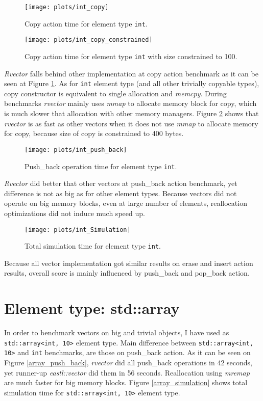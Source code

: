 \documentclass[inz, english, shortabstract]{iithesis}
\begin{document}
\begin{figure}[h!]
\label{int_copy}
\texttt{[image: plots/int\_copy]}
\caption{Copy action time for element type \lstinline{int}.}
\end{figure}

\begin{figure}[h!]
\label{int_copy_constrained}
\texttt{[image: plots/int\_copy\_constrained]}
\caption{Copy action time for element type \lstinline{int} with size constrained to 100.}
\end{figure}

{\it Rvector} falls behind other implementation at copy action benchmark as it can be seen at Figure \ref{int_copy}. As for \lstinline{int} element type (and all other trivially copyable types), copy constructor is equivalent to single allocation and {\it memcpy}. During benchmarks {\it rvector} mainly uses {\it mmap} to allocate memory block for copy, which is much slower that allocation with other memory managers. Figure \ref{int_copy_constrained} shows that {\it rvector} is as fast as other vectors when it does not use {\it mmap} to allocate memory for copy, because size of copy is constrained to 400 bytes.

\begin{figure}[h!]
\label{int_push_back}
\texttt{[image: plots/int\_push\_back]}
\caption{Push\_back operation time for element type \lstinline{int}.}
\end{figure}

{\it Rvector} did better that other vectors at push\_back action benchmark, yet difference is not as big as for other element types. Because vectors did not operate on big memory blocks, even at large number of elements, reallocation optimizations did not induce much speed up.

\begin{figure}[h!]
\label{int_simulation}
\texttt{[image: plots/int\_Simulation]}
\caption{Total simulation time for element type \lstinline{int}.}
\end{figure}

Because all vector implementation got similar results on erase and insert action results, overall score is mainly influenced by push\_back and pop\_back action.

\section{Element type: std::array}
In order to benchmark vectors on big and trivial objects, I have used as \lstinline{std::array<int, 10>} element type. Main difference between \lstinline{std::array<int, 10>} and \lstinline{int} benchmarks, are those on push\_back action. As it can be seen on Figure \ref{array_push_back}, {\it rvector} did all push\_back operations in 42 seconds, yet runner-up {\it eastl::vector} did them in 56 seconds. Reallocation using {\it mremap} are much faster for big memory blocks. Figure \ref{array_simulation} shows total simulation time for \lstinline{std::array<int, 10>} element type.
\end{document}
